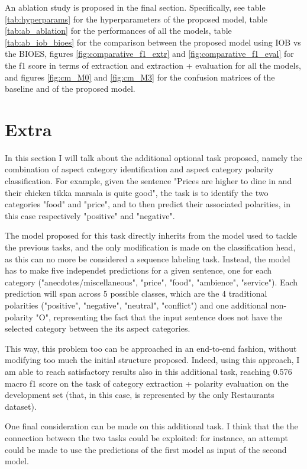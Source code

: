 \documentclass[11pt,a4paper]{article}
\begin{document}
	An ablation study is proposed in the final section. Specifically, see table \ref{tab:hyperparams} for the hyperparameters of the proposed model, table 
	\ref{tab:ab_ablation} for the performances of all the models,
	table \ref{tab:ab_iob_bioes} for the comparison between the proposed model using
	IOB vs the BIOES, figures \ref{fig:comparative_f1_extr} and
	\ref{fig:comparative_f1_eval} for the f1 score in terms
	of extraction and extraction + evaluation for all the models, and figures \ref{fig:cm_M0} and \ref{fig:cm_M3} for the confusion matrices of the baseline and of the proposed model.
	
	\section{Extra}
	In this section I will talk about the additional optional task proposed, namely the combination of aspect category identification and aspect category polarity classification. For example, given the sentence "Prices are higher to dine in and their chicken tikka marsala is quite good", the task is to identify the two categories "food" and "price", and to then predict their associated polarities, in this case respectively "positive" and "negative".
	
	The model proposed for this task directly inherits from the model used to tackle the previous tasks, and the only modification is made on the classification head, as this can no more be considered a sequence labeling task. Instead, the model has to make five independet predictions for a given sentence, one for each category ("anecdotes/miscellaneous", "price", "food", "ambience", "service"). Each prediction will span across 5 possible classes, which are the 4 traditional polarities ("positive", "negative", "neutral", "conflict") and one additional non-polarity "O", representing the fact that the input sentence does not have the selected category between the its aspect categories.
	
	This way, this problem too can be approached in an end-to-end fashion, without modifying too much the initial structure proposed. Indeed, using this approach, I am able to reach satisfactory results also in this additional task, reaching 0.576 macro f1 score on the task of category extraction + polarity evaluation on the development set (that, in this case, is represented by the only Restaurants dataset).
	
	One final consideration can be made on this additional task. I think that the the connection between the two tasks could be exploited: for instance, an attempt could be made to use the predictions of the first model as input of the second model.
	
\end{document}
